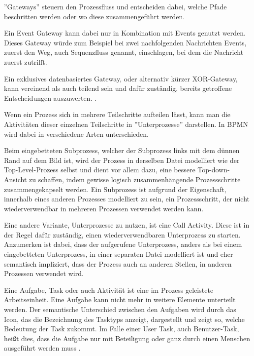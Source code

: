 ''Gateways'' steuern den Prozessfluss und entscheiden dabei, welche Pfade beschritten werden oder wo diese zusammengeführt werden.

Ein Event Gateway kann dabei nur in Kombination mit Events genutzt werden. Dieses Gateway würde zum Beispiel bei zwei nachfolgenden Nachrichten Events, zuerst den Weg, auch Sequenzfluss genannt, einschlagen, bei dem die Nachricht zuerst zutrifft. \citep[vgl.][S. 46]{bruce_bpmn_2012}

Ein exklusives datenbasiertes Gateway, oder alternativ kürzer XOR-Gateway, kann vereinend als auch teilend sein und dafür zuständig, bereits getroffene Entscheidungen auszuwerten. \citep[vgl.][S. 125f]{bruce_englisch_2011}. 

\clearpage
{}
Wenn ein Prozess sich in mehrere Teilschritte aufteilen lässt, kann man die Aktivitäten dieser einzelnen Teilschritte in ''Unterprozesse'' darstellen. In BPMN wird dabei in verschiedene Arten unterschieden. \citep[vgl.][S. 41]{bruce_bpmn_2012}

Beim eingebetteten Subprozess, welcher der Subprozess links mit dem dünnen Rand auf dem Bild ist, wird der Prozess in derselben Datei modelliert wie der Top-Level-Prozess selbst und dient vor allem dazu, eine bessere Top-down-Ansicht zu schaffen, indem gewisse logisch zusammenhängende Prozessschritte zusammengekapselt werden. Ein Subprozess ist aufgrund der Eigenschaft, innerhalb eines anderen Prozesses modelliert zu sein, ein Prozessschritt, der nicht wiederverwendbar in mehreren Prozessen verwendet werden kann. \citep[vgl.][S. 35, 37f]{bruce_englisch_2011}

Eine andere Variante, Unterprozesse zu nutzen, ist eine Call Activity. Diese ist in der Regel dafür zuständig, einen wiederverwendbaren Unterprozess zu starten. Anzumerken ist dabei, dass der aufgerufene Unterprozess, anders als bei einem eingebetteten Unterprozess, in einer separaten Datei modelliert ist und eher semantisch impliziert, dass der Prozess auch an anderen Stellen, in anderen Prozessen verwendet wird. \citep[vgl.][S. 38f]{bruce_englisch_2011}

Eine Aufgabe, Task oder auch Aktivität ist eine im Prozess geleistete Arbeitseinheit. Eine Aufgabe kann nicht mehr in weitere Elemente unterteilt werden. Der semantische Unterschied zwischen den Aufgaben wird durch das Icon, das die Bezeichnung des Tasktyps anzeigt, dargestellt und zeigt so, welche Bedeutung der Task zukommt. Im Falle einer User Task, auch Benutzer-Task, heißt dies, dass die Aufgabe nur mit Beteiligung oder ganz durch einen Menschen ausgeführt werden muss \citep[vgl.][S. 39ff]{bruce_bpmn_2012}.

